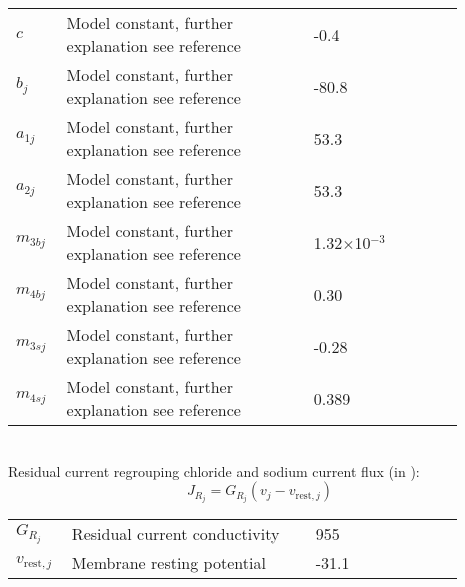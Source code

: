 \begin{table}[h!]
\centering
\begin{tabular}{ p{0.09\linewidth}  >{\footnotesize} p{0.5\linewidth}  >{\footnotesize} p{0.27\linewidth} >{\footnotesize} p{0.03\linewidth} }
\hline
$c$      				& Model constant, further explanation see reference					& -0.4 \uM			& \cite{Koenigsberger2006} \\
$b_{j}$      			& Model constant, further explanation see reference					& -80.8 \mV		& \cite{Koenigsberger2006} \\
$a_{1j}$      			& Model constant, further explanation see reference					& 53.3 \uMkeermV	& \cite{Koenigsberger2006} \\
$a_{2j}$      			& Model constant, further explanation see reference					& 53.3 \mVpuM		& \cite{Koenigsberger2006} \\
$m_{3bj}$      			& Model constant, further explanation see reference					& 1.32$\times$10$^{-3}$ \uMpmV	& \cite{Koenigsberger2006} \\
$m_{4bj}$      			& Model constant, further explanation see reference					& 0.30	\uMkeermV	& \cite{Koenigsberger2006} \\
$m_{3sj}$      			& Model constant, further explanation see reference					& -0.28 \uM		& \cite{Koenigsberger2006} \\
$m_{4sj}$      			& Model constant, further explanation see reference					& 0.389 \uM		& \cite{Koenigsberger2006} \\
\hline
\end{tabular}
\label{tab:JBKCAj}
\end{table}
\\
%
Residual current regrouping chloride and sodium current flux (in \uMs):
\begin{equation} \label{eq:JRj}
J_{R_{j}} = G_{R_{j}} ( v_{j} - v_{\text{rest},j}  )
\end{equation}
%
\begin{table}[h!]
\centering
\begin{tabular}{ p{0.09\linewidth}  >{\footnotesize} p{0.5\linewidth}  >{\footnotesize} p{0.27\linewidth} >{\footnotesize} p{0.03\linewidth} }
\hline
$G_{R_{j}}$      		& Residual current conductivity										& 955 \pS			& \cite{Koenigsberger2006} \\
$v_{\text{rest},j}$      		& Membrane resting potential						 				& -31.1 \mV		& \cite{Koenigsberger2006} \\
\hline
\end{tabular}
\label{tab:JRj}
\end{table}
